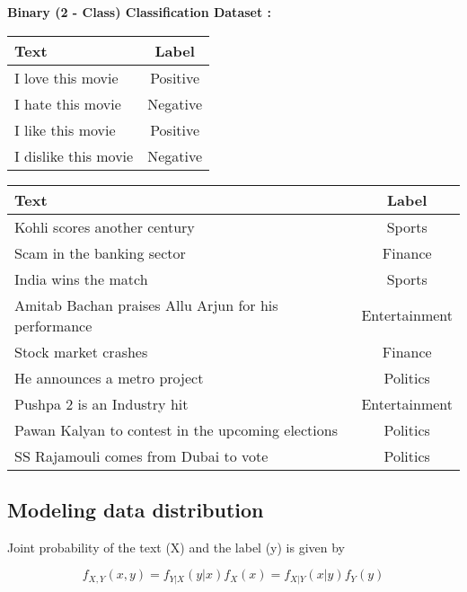 {\bf Binary (2 - Class) Classification Dataset :}
\begin{center}
	\centering
	\begin{tabular}{|l|c|}
		\hline
		\textbf{Text} & \textbf{Label} \\
		\hline
		I love this movie & Positive \\
		\hline
		I hate this movie & Negative \\
		\hline
		I like this movie & Positive \\
		\hline
		I dislike this movie & Negative \\
		\hline
	\end{tabular}
\end{center}

\begin{center}
	\centering
	\begin{tabular}{|l|c|}
		\hline
		\textbf{Text} & \textbf{Label} \\
		\hline
		Kohli scores another century & Sports \\
		\hline 
		Scam in the banking sector & Finance \\
		\hline
		India wins the match & Sports \\
		\hline 
		Amitab Bachan praises Allu Arjun for his performance & Entertainment \\
		\hline
		Stock market crashes & Finance \\
		\hline
		He announces a metro project & Politics \\
		\hline
		Pushpa 2 is an Industry hit & Entertainment \\
		\hline
		Pawan Kalyan to contest in the upcoming elections & Politics \\
		\hline
		SS Rajamouli comes from Dubai to vote & Politics \\
		\hline
	\end{tabular}
\end{center}

\subsection{Modeling data distribution}

Joint probability of the text (X) and the label (y) is given by 

\[
	f_{X,Y}(x,y) = f_{Y|X}(y|x) f_X(x) = f_{X|Y}(x|y) f_Y(y)
\]

